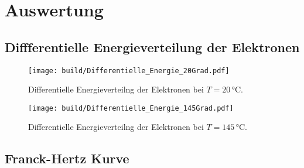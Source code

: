 \section{Auswertung}
\label{sec:Auswertung}

\subsection{Diffferentielle Energieverteilung der Elektronen}

\begin{figure}[H]
    \centering
    \texttt{[image: build/Differentielle\_Energie\_20Grad.pdf]}
    \caption{Differentielle Energieverteilng der Elektronen bei $T=20\,\unit{\celsius}$.}
    \label{fig:Diff Energie 20Grad}
  \end{figure}

\begin{figure}[H]
    \centering
    \texttt{[image: build/Differentielle\_Energie\_145Grad.pdf]}
    \caption{Differentielle Energieverteilng der Elektronen bei $T=145\,\unit{\celsius}$.}
    \label{fig:Diff Energie 145Grad}
\end{figure}

\subsection{Franck-Hertz Kurve}